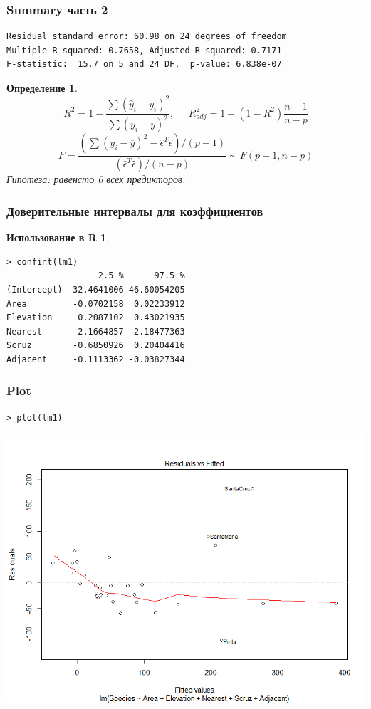 \documentclass{beamer}
\newtheorem{defn}{Определение}
\newtheorem{exmpr}{Использование в R}
\begin{document}
\begin{frame}[containsverbatim]
\frametitle{Summary часть 2}
\begin{verbatim}
Residual standard error: 60.98 on 24 degrees of freedom
Multiple R-squared: 0.7658,	Adjusted R-squared: 0.7171 
F-statistic:  15.7 on 5 and 24 DF,  p-value: 6.838e-07 
\end{verbatim}
\begin{defn}
$$R^2=1-\frac{\sum(\hat{y}_i-y_i)^2}{\sum(y_i-\overline{y})^2},\;\;\;\;\; R^2_{adj}=1-(1-R^2)\frac{n-1}{n-p}$$
$$F=\frac{(\sum(y_i-\overline{y})^2-\hat{\epsilon}^T\hat{\epsilon})/(p-1)}{(\hat{\epsilon}^T\hat{\epsilon})/(n-p)}\sim F(p-1,n-p)$$
Гипотеза: равенсто 0 всех предикторов.
\end{defn}
\end{frame}

\begin{frame}[containsverbatim]
\frametitle{Доверительные интервалы для коэффициентов}
\begin{exmpr}
\begin{verbatim}
> confint(lm1)
                  2.5 %      97.5 %
(Intercept) -32.4641006 46.60054205
Area         -0.0702158  0.02233912
Elevation     0.2087102  0.43021935
Nearest      -2.1664857  2.18477363
Scruz        -0.6850926  0.20404416
Adjacent     -0.1113362 -0.03827344
\end{verbatim}
\end{exmpr}
\end{frame}

\begin{frame}[containsverbatim]
\frametitle{Plot}
\begin{verbatim}
> plot(lm1)
\end{verbatim}
\begin{center}
\includegraphics[width=1\textwidth,height=0.7\textheight]{lmplot1.png}
\end{center}

\end{frame}
\end{document}
